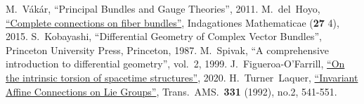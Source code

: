 \begin{thebibliography}{}
     M.~V\'ak\'ar, ``Principal Bundles and Gauge Theories'', 2011.
     M.~del~Hoyo, \href{https://arxiv.org/abs/1512.03847}{``Complete connections on fiber bundles''}, Indagationes Mathematicae (\textbf{27} 4), 2015.
     S.~Kobayashi, ``Differential Geometry of Complex Vector Bundles'', Princeton University Press, Princeton, 1987.
     M.~Spivak, ``A comprehensive introduction to differential geometry'', vol.~2, 1999.
     J.~Figueroa-O'Farrill, \href{https://arxiv.org/abs/2009.01948v1}{``On the intrinsic torsion of spacetime structures''}, 2020.
     H.~Turner~Laquer, \href{https://doi.org/10.2307/2154126}{``Invariant Affine Connections on Lie Groups''}, Trans.~AMS.~\textbf{331} (1992), no.2, 541-551.
    
    
\end{thebibliography}